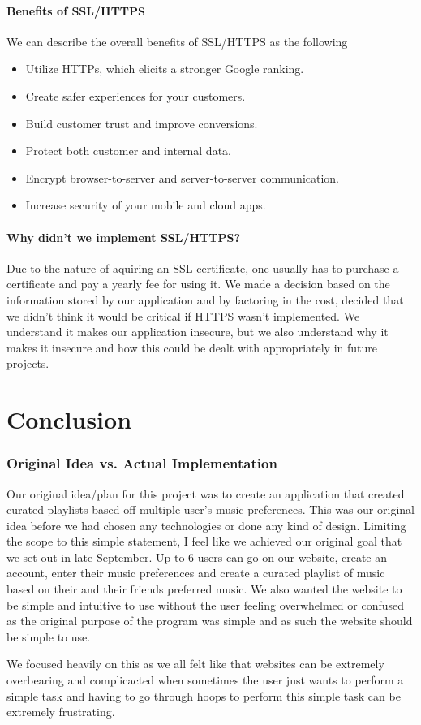     \subsubsection{Benefits of SSL/HTTPS}
    We can describe the overall benefits of SSL/HTTPS as the following

    \begin{itemize}
      \item Utilize HTTPs, which elicits a stronger Google ranking.
      \item Create safer experiences for your customers.
      \item Build customer trust and improve conversions.
      \item Protect both customer and internal data.
      \item Encrypt browser-to-server and server-to-server communication.
      \item Increase security of your mobile and cloud apps.
    \end{itemize}

    \subsubsection{Why didn't we implement SSL/HTTPS?}
    Due to the nature of aquiring an SSL certificate, one usually has to purchase a certificate and pay a yearly fee for using it. We made a decision based on the information stored by our application and by factoring in the cost, decided that we didn't think it would be critical if HTTPS wasn't implemented.
    We understand it makes our application insecure, but we also understand why it makes it insecure and how this could be dealt with appropriately in future projects.


\chapter{Conclusion}

\subsection{Original Idea vs. Actual Implementation}
Our original idea/plan for this project was to create an application that created curated playlists based off multiple user's music preferences. This was our original idea before we had chosen any technologies or done any kind of design. Limiting the scope to this simple statement, I feel like we achieved our original goal that we set out in late September.
Up to 6 users can go on our website, create an account, enter their music preferences and create a curated playlist of music based on their and their friends preferred music. We also wanted the website to be simple and intuitive to use without the user feeling overwhelmed or confused as the original purpose of the program was simple and as such the website should be simple to use. \par
We focused heavily on this as we all felt like that websites can be extremely overbearing and complicacted when sometimes the user just wants to perform a simple task and having to go through hoops to perform this simple task can be extremely frustrating.

